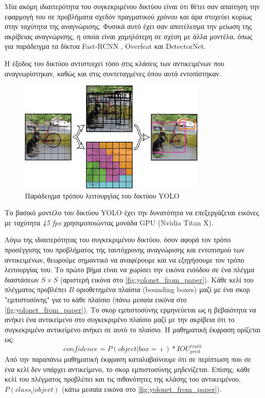 Μία ακόμη ιδιαιτερότητα του συγκεκριμένου δικτύου είναι ότι θέτει σαν απαίτηση
την εφαρμογή του σε προβλήματα σχεδόν πραγματικού χρόνου και άρα στοχεύει κυρίως
στην ταχύτητα της αναγνώρισης. Φυσικά αυτό έχει σαν αποτέλεσμα την μείωση της ακρίβειας
αναγνώρισης, η οποία είναι χαμηλότερη σε σχέση με άλλα μοντέλα, όπως για παράδειγμα τα δίκτυα
Fast-RCNN \cite{DBLP:journals/corr/Girshick15}, Overfeat και DetectorNet.

Η έξοδος του δικτύου αντιστοιχεί τόσο στις κλάσεις των αντικειμένων
που αναγνωρίστηκαν, καθώς και στις συντεταγμένες όπου αυτά εντοπίστηκαν.

\begin{figure}[!ht]
  \centering
  \includegraphics[width=0.8\textwidth]{./images/chapter5/yolonet_from_paper_1.png}
  \caption[Παράδειγμα τρόπου λειτουργίας του δικτύου YOLO]{Παράδειγμα τρόπου λειτουργίας του δικτύου YOLO}
  \label{fig:yolonet_from_paper}
\end{figure}

Το βασικό μοντέλο του δικτύου YOLO έχει την δυνατότητα να επεξεργάζεται εικόνες με ταχύτητα
\emph{45 fps} χρησιμοποιώντας μονάδα GPU (Nvidia Titan X).

Λόγω της ιδιαιτερότητας του συγκεκριμένου δικτύου, όσον αφορά τον τρόπο προσέγγισης του προβλήματος της ταυτόχρονης
αναγνώρισης και εντοπισμού των αντικειμένων, θεωρούμε σημαντικό να αναφέρουμε
και να εξηγήσουμε τον τρόπο λειτουργίας του.
Το πρώτο βήμα είναι να χωρίσει την εικόνα εισόδου σε ένα πλέγμα διαστάσεων $S \times S$
(αριστερή εικόνα στο \autoref{fig:yolonet_from_paper}).
Κάθε κελί του πλέγματος προβλέπει $B$ οριοθετημένα πλαίσια (bounding boxes) μαζί με ένα σκορ
"εμπιστοσύνης" για το κάθε πλαίσιο (πάνω μεσαία εικόνα στο \autoref{fig:yolonet_from_paper}).
Το σκορ εμπιστοσύνης ερμηνεύεται ως η βεβαιότητα
να ανήκει ένα αντικείμενο στο συγκεκριμένο πλαίσιο μαζί με την ακρίβεια ότι
το συγκεκριμένο αντικείμενο ανήκει σε αυτό το πλαίσιο. Η μαθηματική έκφραση
ορίζεται ως:
\begin{equation*}
  confidence = P(object | box = \imath) * IOU_{pred}^{truth}
\end{equation*}
Από την παραπάνω μαθηματική έκφραση καταλαβαίνουμε ότι σε περίπτωση που
σε ένα κελί δεν υπάρχει αντικείμενο, το σκορ εμπιστοσύνης μηδενίζεται.
Επίσης, κάθε κελί του πλέγματος προβλέπει και τις πιθανότητες της κλάσης
του αντικειμένου, $P(class_{\imath} | object)$
(κάτω μεσαία εικόνα στο \autoref{fig:yolonet_from_paper}).

